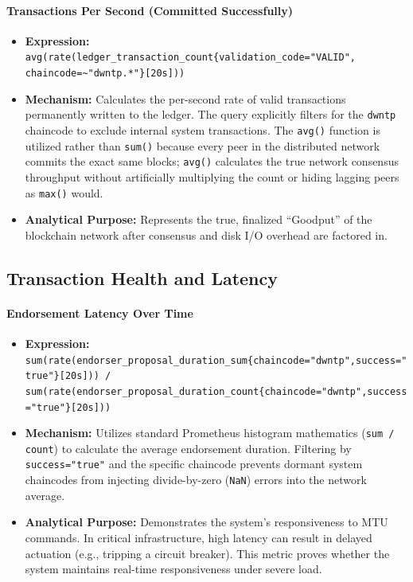 \paragraph{Transactions Per Second (Committed Successfully)}
\begin{itemize}
    \item \textbf{Expression:} \verb|avg(rate(ledger_transaction_count{validation_code="VALID", chaincode=~"dwntp.*"}[20s]))|
    \item \textbf{Mechanism:} Calculates the per-second rate of valid transactions permanently written to the ledger. The query explicitly filters for the \texttt{dwntp} chaincode to exclude internal system transactions. The \texttt{avg()} function is utilized rather than \texttt{sum()} because every peer in the distributed network commits the exact same blocks; \texttt{avg()} calculates the true network consensus throughput without artificially multiplying the count or hiding lagging peers as \texttt{max()} would.
    \item \textbf{Analytical Purpose:} Represents the true, finalized ``Goodput'' of the blockchain network after consensus and disk I/O overhead are factored in.
\end{itemize}

\subsection{Transaction Health and Latency}

\paragraph{Endorsement Latency Over Time}
\begin{itemize}
    \item \textbf{Expression:} \verb|sum(rate(endorser_proposal_duration_sum{chaincode="dwntp",success="true"}[20s])) / sum(rate(endorser_proposal_duration_count{chaincode="dwntp",success="true"}[20s]))|
    \item \textbf{Mechanism:} Utilizes standard Prometheus histogram mathematics (\texttt{sum / count}) to calculate the average endorsement duration. Filtering by \texttt{success="true"} and the specific chaincode prevents dormant system chaincodes from injecting divide-by-zero (\texttt{NaN}) errors into the network average.
    \item \textbf{Analytical Purpose:} Demonstrates the system's responsiveness to MTU commands. In critical infrastructure, high latency can result in delayed actuation (e.g., tripping a circuit breaker). This metric proves whether the system maintains real-time responsiveness under severe load.
\end{itemize}

